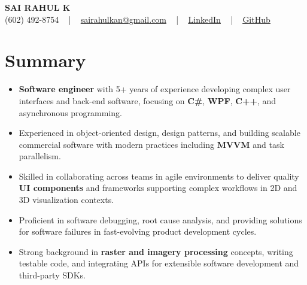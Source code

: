 \documentclass[letterpaper,11pt]{article}
\newcommand{\resumeItem}[1]{
  \item\footnotesize{
    {#1 \vspace{-2pt}}
  }
}
\newcommand{\resumeItemListStart}{\begin{itemize}[leftmargin=*]}
\newcommand{\resumeItemListEnd}{\end{itemize}\vspace{-5pt}}
\begin{document}
\begin{center}
    {\fontsize{14pt}{12pt}\selectfont \textbf{\MakeUppercase{Sai Rahul K}}}\\ \vspace{2pt}
    \fontsize{10pt}{12pt}\selectfont (602) 492-8754 ~ | ~ \href{mailto:sairahulkan@gmail.com}{sairahulkan@gmail.com} ~ | ~
    \href{https://www.linkedin.com/in/rq123/}{\color{blue}\underline{LinkedIn}} ~ | ~
    \href{https://github.com/kanrahuldo}{\color{blue}\underline{GitHub}}~
    \vspace{-8pt}
\end{center}

\section{Summary}
\fontsize{9pt}{10pt}\selectfont
\resumeItemListStart
    \resumeItem{\textbf{Software engineer} with 5+ years of experience developing complex user interfaces and back-end software, focusing on \textbf{C\#}, \textbf{WPF}, \textbf{C++}, and asynchronous programming.}
    \resumeItem{Experienced in object-oriented design, design patterns, and building scalable commercial software with modern practices including \textbf{MVVM} and task parallelism.}
    \resumeItem{Skilled in collaborating across teams in agile environments to deliver quality \textbf{UI components} and frameworks supporting complex workflows in 2D and 3D visualization contexts.}
    \resumeItem{Proficient in software debugging, root cause analysis, and providing solutions for software failures in fast-evolving product development cycles.}
    \resumeItem{Strong background in \textbf{raster and imagery processing} concepts, writing testable code, and integrating APIs for extensible software development and third-party SDKs.}
\resumeItemListEnd
\vspace{-6pt}
\end{document}
